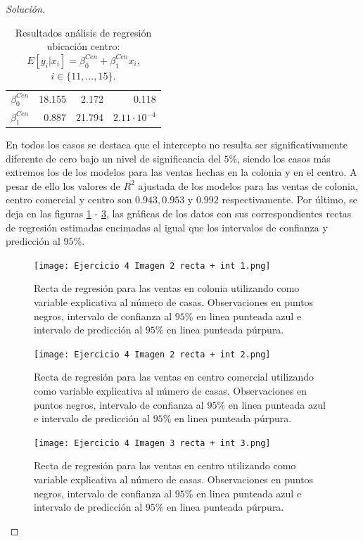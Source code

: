 \documentclass[10.5pt,notitlepage]{article}
\newenvironment{solucion}
  {\begin{proof}[Solución]}
  {\end{proof}}
\theoremstyle{plain}
\begin{document}
\begin{solucion}
\begin{table}[H]
\begin{tabular}{@{}l@{\hskip 0.3in}r@{\hskip 0.3in}r@{\hskip 0.3in}r@{}}
            \(\beta_{0}^{Cen}\) & 18.155 &  2.172& 0.118\\
            \(\beta_{1}^{Cen}\) & 0.887 &  21.794& \(2.11\cdot10^{-4}\) \\ 
            \bottomrule
        \end{tabular}
        \caption{Resultados análisis de regresión ubicación centro: \(E[y_{i}|x_{i}] = \beta_{0}^{Cen} + \beta_{1}^{Cen}x_{i}\), \(i \in \{11,\hdots,15\}\).}
        \label{tab:reg12}
\end{table}
En todos los casos se destaca que el intercepto no resulta ser significativamente diferente de cero bajo un nivel de significancia del \(5\%\), siendo los casos más extremos los de los modelos para las ventas hechas en la colonia y en el centro. A pesar de ello los valores de \(R^2\) ajustada de los modelos para las ventas de colonia, centro comercial y centro son \(0.943,0.953\) y \(0.992\) respectivamente. Por último, se deja en las figuras \ref{fig:19} - \ref{fig:21}, las gráficas de los datos con sus correspondientes rectas de regresión estimadas encimadas al igual que los intervalos de confianza y predicción al \(95\%\).\\ 

\begin{figure}[htb]
 \centering
 \texttt{[image: Ejercicio 4 Imagen 2 recta + int 1.png]}
 \caption{Recta de regresión para las ventas en colonia utilizando como variable explicativa al número de casas. Observaciones en puntos negros, intervalo de confianza al \(95\%\) en linea punteada azul e intervalo de predicción al \(95\%\) en linea punteada púrpura.}
\label{fig:19}
\end{figure}
\begin{figure}[htb]
 \centering
 \texttt{[image: Ejercicio 4 Imagen 2 recta + int 2.png]}
 \caption{Recta de regresión para las ventas en centro comercial utilizando como variable explicativa al número de casas. Observaciones en puntos negros, intervalo de confianza al \(95\%\) en linea punteada azul e intervalo de predicción al \(95\%\) en linea punteada púrpura.}
\label{fig:20}
\end{figure}
\begin{figure}[htb]
 \centering
 \texttt{[image: Ejercicio 4 Imagen 3 recta + int 3.png]}
 \caption{Recta de regresión para las ventas en centro utilizando como variable explicativa al número de casas. Observaciones en puntos negros, intervalo de confianza al \(95\%\) en linea punteada azul e intervalo de predicción al \(95\%\) en linea punteada púrpura.}
\label{fig:21}
\end{figure}


\end{solucion}
\end{document}
